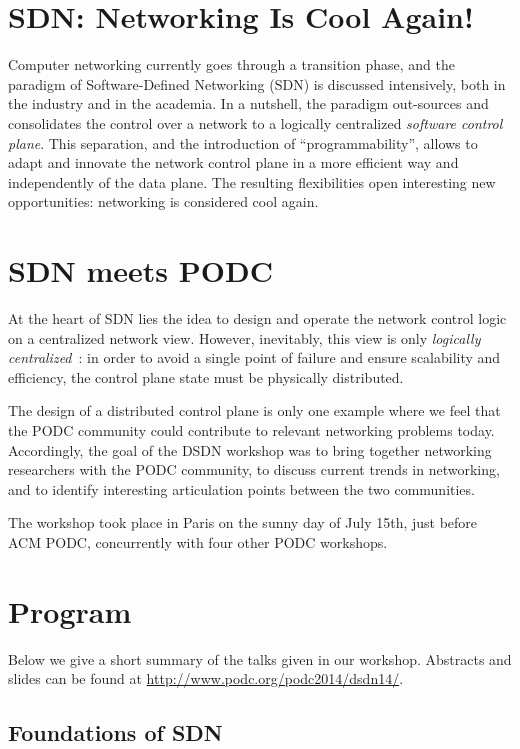 \documentclass[11pt,pdftex,letter]{article}
\begin{document}
\section{SDN: Networking Is Cool Again!}

Computer networking currently goes through a transition phase,
and the paradigm of Software-Defined Networking (SDN)
is discussed intensively, both in the industry and in the academia. In
a nutshell, the paradigm out-sources and consolidates the control over a network
to a logically centralized \emph{software control plane}.
This separation, and the introduction of ``programmability'',
allows to adapt and innovate the network control plane in a more
efficient way and independently of the data plane.
The resulting flexibilities open interesting new opportunities:
networking is considered cool again.

\section{SDN meets PODC}

At the heart of SDN lies the idea to design and operate
the network control logic
on a centralized network view.
However, inevitably, this view is only \emph{logically centralized}~\cite{onix}:
in order to avoid a single point of failure and ensure scalability and efficiency,
the control plane state must
be physically distributed.

The design of a distributed control plane is only one example where we feel that the
PODC community could contribute to relevant networking problems today.
Accordingly, the goal of the DSDN workshop was to bring together networking researchers with the PODC
community, to discuss current trends in networking, and to identify interesting articulation
points between the two communities.

The workshop took
place in Paris on the sunny day of July 15th, just before
ACM PODC, concurrently with four other PODC workshops.

\section{Program}

Below we give a short summary of the talks given in our
workshop. Abstracts and slides can be found at \url{http://www.podc.org/podc2014/dsdn14/}.

\subsection{Foundations of SDN}
\end{document}
